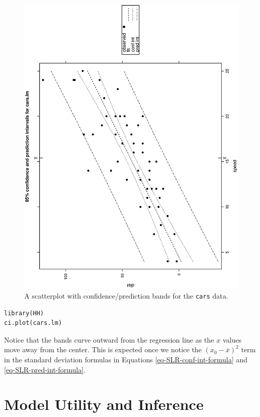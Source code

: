 \documentclass[captions=tableheading]{scrbook}
\begin{document}
\begin{figure}[th]
  \includegraphics[angle=270, totalheight=4in]{ps/slr/carscipi.ps}
  \caption[Scatterplot with confidence/prediction bands for the \texttt{cars} data]{\small A scatterplot with confidence/prediction bands for the \texttt{cars} data.}
  \label{fig-Scatter-cars-CIPI}
\end{figure}



\begin{verbatim}
library(HH)
ci.plot(cars.lm)
\end{verbatim}

Notice that the bands curve outward from the regression line as the \(x\) values move away from the center. This is expected once we notice the \((x_{0}-\overline{x})^{2}\) term in the standard deviation formulas in Equations \ref{eq-SLR-conf-int-formula} and \ref{eq-SLR-pred-int-formula}.
\section{Model Utility and Inference}
\label{sec-11-3}
\label{sec-Model-Utility-SLR}
\end{document}
